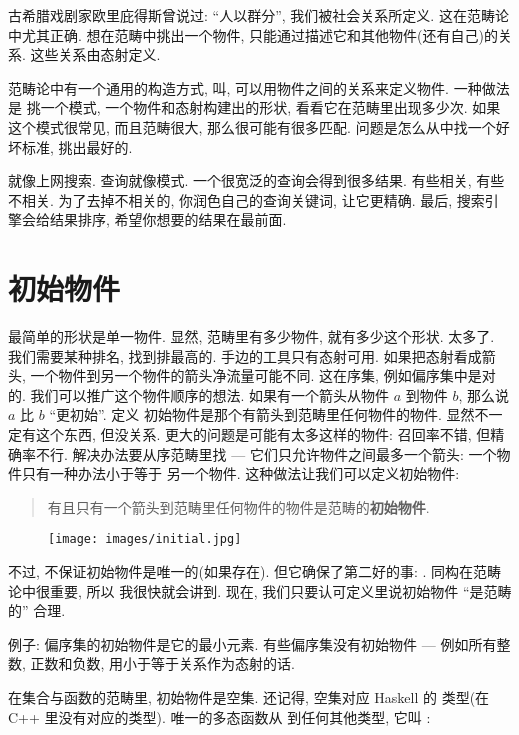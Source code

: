 
\lettrine[lhang=0.17]{古}希腊戏剧家欧里庇得斯曾说过: ``人以群分'', 我们被社会关系所定义.
这在范畴论中尤其正确. 想在范畴中挑出一个物件, 只能通过描述它和其他物件(还有自己)的关系.
这些关系由态射定义.

范畴论中有一个通用的构造方式, 叫, 可以用物件之间的关系来定义物件. 一种做法是
挑一个模式, 一个物件和态射构建出的形状, 看看它在范畴里出现多少次. 如果这个模式很常见, 而且范畴很大,
那么很可能有很多匹配. 问题是怎么从中找一个好坏标准, 挑出最好的.

就像上网搜索. 查询就像模式. 一个很宽泛的查询会得到很多结果. 有些相关, 有些不相关. 为了去掉不相关的,
你润色自己的查询关键词, 让它更精确. 最后, 搜索引擎会给结果排序, 希望你想要的结果在最前面.

\section{初始物件}

最简单的形状是单一物件. 显然, 范畴里有多少物件, 就有多少这个形状. 太多了. 我们需要某种排名, 找到排最高的.
手边的工具只有态射可用. 如果把态射看成箭头, 一个物件到另一个物件的箭头净流量可能不同. 这在序集, 例如偏序集中是对的.
我们可以推广这个物件顺序的想法. 如果有一个箭头从物件 $a$ 到物件 $b$, 那么说 $a$ 比 $b$ ``更初始''. 定义
初始物件是那个有箭头到范畴里任何物件的物件. 显然不一定有这个东西, 但没关系. 更大的问题是可能有太多这样的物件:
召回率不错, 但精确率不行. 解决办法要从序范畴里找 --- 它们只允许物件之间最多一个箭头: 一个物件只有一种办法小于等于
另一个物件. 这种做法让我们可以定义初始物件:

\begin{quote}
  有且只有一个箭头到范畴里任何物件的物件是范畴的\textbf{初始物件}.
\end{quote}

\begin{figure}[H]
  \centering
  \texttt{[image: images/initial.jpg]}
\end{figure}

\noindent
不过, 不保证初始物件是唯一的(如果存在). 但它确保了第二好的事: . 同构在范畴论中很重要, 所以
我很快就会讲到. 现在, 我们只要认可定义里说初始物件 ``是范畴的'' 合理.

例子: 偏序集的初始物件是它的最小元素. 有些偏序集没有初始物件 --- 例如所有整数, 正数和负数, 用小于等于关系作为态射的话.

在集合与函数的范畴里, 初始物件是空集. 还记得, 空集对应 Haskell 的  类型(在 C++ 里没有对应的类型).
唯一的多态函数从  到任何其他类型, 它叫 :


